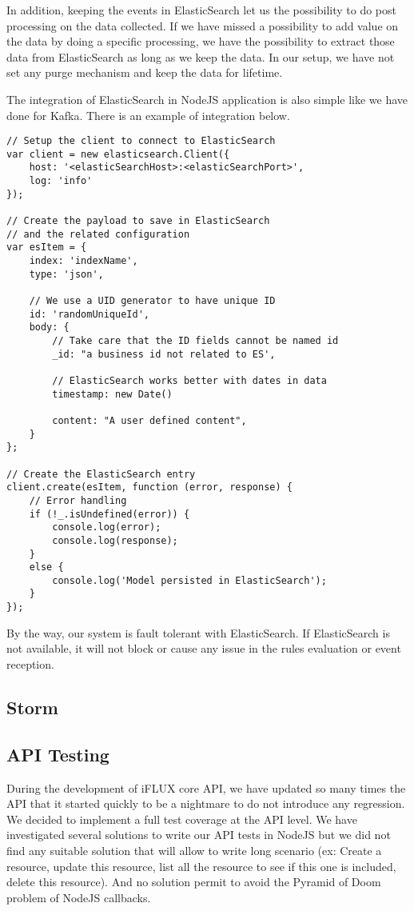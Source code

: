 In addition, keeping the events in ElasticSearch let us the possibility to do post processing on the data collected. If we have missed a possibility to add value on the data by doing a specific processing, we have the possibility to extract those data from ElasticSearch as long as we keep the data. In our setup, we have not set any purge mechanism and keep the data for lifetime.

The integration of ElasticSearch in NodeJS application is also simple like we have done for Kafka. There is an example of integration below.

\begin{lstlisting}
// Setup the client to connect to ElasticSearch
var client = new elasticsearch.Client({
	host: '<elasticSearchHost>:<elasticSearchPort>',
	log: 'info'
});

// Create the payload to save in ElasticSearch 
// and the related configuration
var esItem = {
	index: 'indexName',
	type: 'json',

	// We use a UID generator to have unique ID
	id: 'randomUniqueId', 
	body: {
		// Take care that the ID fields cannot be named id
		_id: "a business id not related to ES', 

		// ElasticSearch works better with dates in data
		timestamp: new Date() 

		content: "A user defined content",
	}
};

// Create the ElasticSearch entry
client.create(esItem, function (error, response) {
	// Error handling
	if (!_.isUndefined(error)) {
		console.log(error);
		console.log(response);
	}
	else {
		console.log('Model persisted in ElasticSearch');
	}
});
\end{lstlisting}

By the way, our system is fault tolerant with ElasticSearch. If ElasticSearch is not available, it will not block or cause any issue in the rules evaluation or event reception. 

\subsection{Storm}

\subsection{API Testing}

During the development of iFLUX core API, we have updated so many times the API that it started quickly to be a nightmare to do not introduce any regression. We decided to implement a full test coverage at the API level. We have investigated several solutions to write our API tests in NodeJS but we did not find any suitable solution that will allow to write long scenario (ex: Create a resource, update this resource, list all the resource to see if this one is included, delete this resource). And no solution permit to avoid the Pyramid of Doom problem of NodeJS callbacks.


